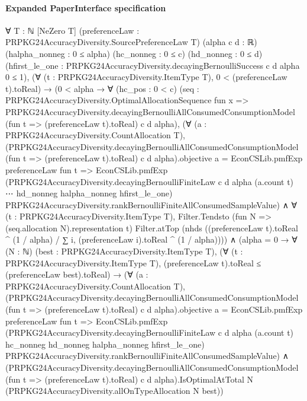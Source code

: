 \documentclass[10pt]{article}
\begin{document}
\paragraph{Expanded PaperInterface specification}
\begin{ReviewVerbatim}
∀ {T : ℕ} [NeZero T] (preferenceLaw : PRPKG24AccuracyDiversity.SourcePreferenceLaw T) (alpha c d : ℝ)
  (halpha_nonneg : 0 ≤ alpha) (hc_nonneg : 0 ≤ c) (hd_nonneg : 0 ≤ d)
  (hfirst_le_one : PRPKG24AccuracyDiversity.decayingBernoulliSuccess c d alpha 0 ≤ 1),
  (∀ (t : PRPKG24AccuracyDiversity.ItemType T), 0 < (preferenceLaw t).toReal) →
    (0 < alpha →
        ∀ (hc_pos : 0 < c)
          (seq :
            PRPKG24AccuracyDiversity.OptimalAllocationSequence fun x =>
              PRPKG24AccuracyDiversity.decayingBernoulliAllConsumedConsumptionModel (fun t => (preferenceLaw t).toReal)
                c d alpha),
          (∀ (a : PRPKG24AccuracyDiversity.CountAllocation T),
              (PRPKG24AccuracyDiversity.decayingBernoulliAllConsumedConsumptionModel (fun t => (preferenceLaw t).toReal)
                      c d alpha).objective
                  a =
                EconCSLib.pmfExp preferenceLaw fun t =>
                  EconCSLib.pmfExp
                    (PRPKG24AccuracyDiversity.decayingBernoulliFiniteLaw c d alpha (a.count t) ⋯ hd_nonneg halpha_nonneg
                      hfirst_le_one)
                    PRPKG24AccuracyDiversity.rankBernoulliFiniteAllConsumedSampleValue) ∧
            ∀ (t : PRPKG24AccuracyDiversity.ItemType T),
              Filter.Tendsto (fun N => (seq.allocation N).representation t) Filter.atTop
                (nhds ((preferenceLaw t).toReal ^ (1 / alpha) / ∑ i, (preferenceLaw i).toReal ^ (1 / alpha)))) ∧
      (alpha = 0 →
        ∀ (N : ℕ) (best : PRPKG24AccuracyDiversity.ItemType T),
          (∀ (t : PRPKG24AccuracyDiversity.ItemType T), (preferenceLaw t).toReal ≤ (preferenceLaw best).toReal) →
            (∀ (a : PRPKG24AccuracyDiversity.CountAllocation T),
                (PRPKG24AccuracyDiversity.decayingBernoulliAllConsumedConsumptionModel
                        (fun t => (preferenceLaw t).toReal) c d alpha).objective
                    a =
                  EconCSLib.pmfExp preferenceLaw fun t =>
                    EconCSLib.pmfExp
                      (PRPKG24AccuracyDiversity.decayingBernoulliFiniteLaw c d alpha (a.count t) hc_nonneg hd_nonneg
                        halpha_nonneg hfirst_le_one)
                      PRPKG24AccuracyDiversity.rankBernoulliFiniteAllConsumedSampleValue) ∧
              (PRPKG24AccuracyDiversity.decayingBernoulliAllConsumedConsumptionModel (fun t => (preferenceLaw t).toReal)
                    c d alpha).IsOptimalAtTotal
                N (PRPKG24AccuracyDiversity.allOnTypeAllocation N best))
\end{ReviewVerbatim}
\end{document}
